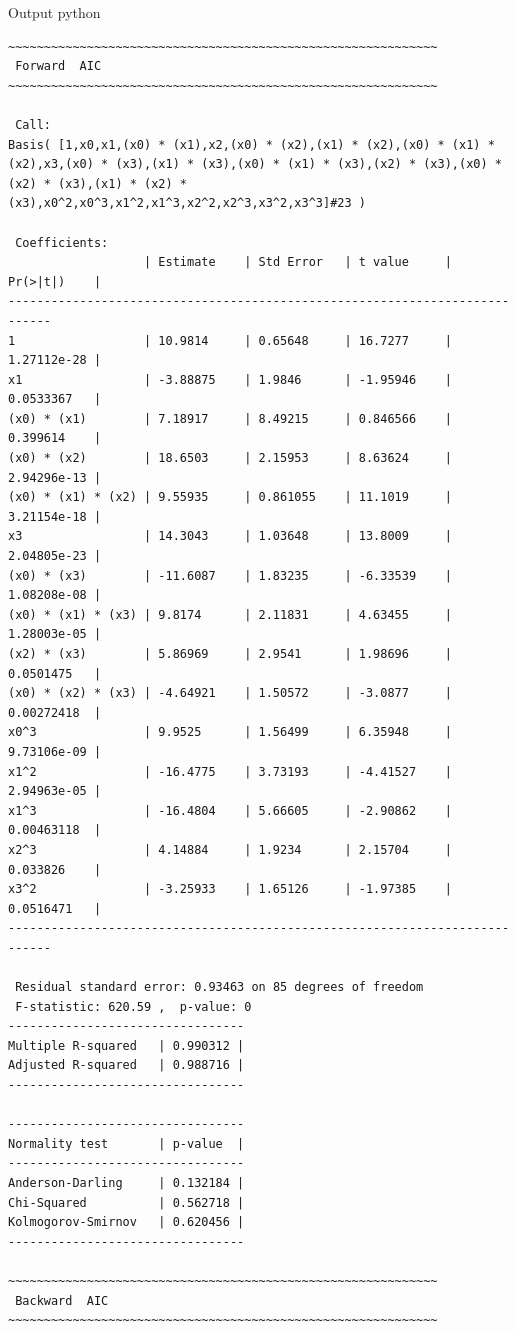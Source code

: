 \newpage
Output python
\begin{lstlisting}[style=output,basicstyle=\tiny]
~~~~~~~~~~~~~~~~~~~~~~~~~~~~~~~~~~~~~~~~~~~~~~~~~~~~~~~~~~~~
 Forward  AIC 
~~~~~~~~~~~~~~~~~~~~~~~~~~~~~~~~~~~~~~~~~~~~~~~~~~~~~~~~~~~~

 Call:
Basis( [1,x0,x1,(x0) * (x1),x2,(x0) * (x2),(x1) * (x2),(x0) * (x1) * (x2),x3,(x0) * (x3),(x1) * (x3),(x0) * (x1) * (x3),(x2) * (x3),(x0) * (x2) * (x3),(x1) * (x2) * (x3),x0^2,x0^3,x1^2,x1^3,x2^2,x2^3,x3^2,x3^3]#23 )

 Coefficients:
                   | Estimate    | Std Error   | t value     | Pr(>|t|)    | 
----------------------------------------------------------------------------
1                  | 10.9814     | 0.65648     | 16.7277     | 1.27112e-28 | 
x1                 | -3.88875    | 1.9846      | -1.95946    | 0.0533367   | 
(x0) * (x1)        | 7.18917     | 8.49215     | 0.846566    | 0.399614    | 
(x0) * (x2)        | 18.6503     | 2.15953     | 8.63624     | 2.94296e-13 | 
(x0) * (x1) * (x2) | 9.55935     | 0.861055    | 11.1019     | 3.21154e-18 | 
x3                 | 14.3043     | 1.03648     | 13.8009     | 2.04805e-23 | 
(x0) * (x3)        | -11.6087    | 1.83235     | -6.33539    | 1.08208e-08 | 
(x0) * (x1) * (x3) | 9.8174      | 2.11831     | 4.63455     | 1.28003e-05 | 
(x2) * (x3)        | 5.86969     | 2.9541      | 1.98696     | 0.0501475   | 
(x0) * (x2) * (x3) | -4.64921    | 1.50572     | -3.0877     | 0.00272418  | 
x0^3               | 9.9525      | 1.56499     | 6.35948     | 9.73106e-09 | 
x1^2               | -16.4775    | 3.73193     | -4.41527    | 2.94963e-05 | 
x1^3               | -16.4804    | 5.66605     | -2.90862    | 0.00463118  | 
x2^3               | 4.14884     | 1.9234      | 2.15704     | 0.033826    | 
x3^2               | -3.25933    | 1.65126     | -1.97385    | 0.0516471   | 
----------------------------------------------------------------------------

 Residual standard error: 0.93463 on 85 degrees of freedom 
 F-statistic: 620.59 ,  p-value: 0
---------------------------------
Multiple R-squared   | 0.990312 | 
Adjusted R-squared   | 0.988716 | 
---------------------------------

---------------------------------
Normality test       | p-value  | 
---------------------------------
Anderson-Darling     | 0.132184 | 
Chi-Squared          | 0.562718 | 
Kolmogorov-Smirnov   | 0.620456 | 
---------------------------------

~~~~~~~~~~~~~~~~~~~~~~~~~~~~~~~~~~~~~~~~~~~~~~~~~~~~~~~~~~~~
 Backward  AIC 
~~~~~~~~~~~~~~~~~~~~~~~~~~~~~~~~~~~~~~~~~~~~~~~~~~~~~~~~~~~~


\end{lstlisting}
